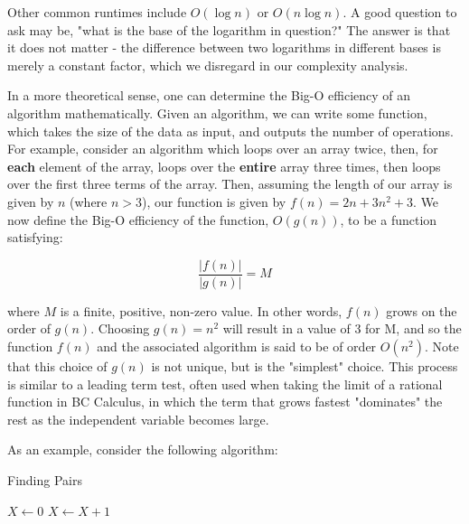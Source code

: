 Other common runtimes include $ O(\log n) $ or $ O(n\log n) $.  A good question to ask may be, "what is the base of the logarithm in question?"  The answer is that it does not matter - the difference between two logarithms in different bases is merely a constant factor, which we disregard in our complexity analysis.

In a more theoretical sense, one can determine the Big-O efficiency of an algorithm mathematically.  Given an algorithm, we can write some function, which takes the size of the data as input, and outputs the number of operations.  For example, consider an algorithm which loops over an array twice, then, for \textbf{each} element of the array, loops over the \textbf{entire} array three times, then loops over the first three terms of the array.  Then, assuming the length of our array is given by $ n $ (where $ n > 3 $), our function is given by $ f(n) = 2n + 3n^2 + 3 $.  We now define the Big-O efficiency of the function, $ O(g(n)) $, to be a function satisfying:

$$ \frac{|f(n)|}{|g(n)|} = M $$

\noindent where $ M $ is a finite, positive, non-zero value.  In other words, $ f(n) $ grows on the order of $ g(n) $.  Choosing $ g(n) = n^2 $ will result in a value of $ 3 $ for M, and so the function $ f(n) $ and the associated algorithm is said to be of order $ O(n^2) $.  Note that this choice of $ g(n) $ is not unique, but is the "simplest" choice.  This process is similar to a leading term test, often used when taking the limit of a rational function in BC Calculus, in which the term that grows fastest "dominates" the rest as the independent variable becomes large.

As an example, consider the following algorithm:

\begin{algorithm}[H]
\caption{Finding Pairs}
\begin{algorithmic}
\State $ X \gets 0 $
            \State $X \gets X + 1$
        \EndIf
    \EndFor
\EndFor
\end{algorithmic}
\end{algorithm}

